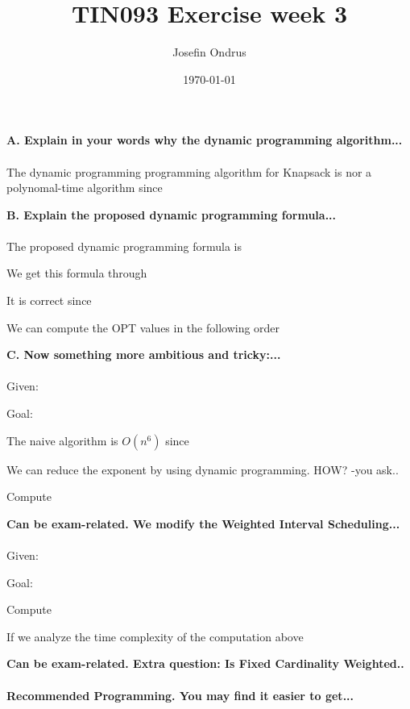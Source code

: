 \documentclass[12pt,oneside,reqno]{amsart}
\begin{document}
\setlength{\parindent}{6pt}
\def\code#1{\texttt{#1}} %

\title{TIN093 Exercise week 3}
\author{Josefin Ondrus}
\date{\today}
\maketitle

\textbf{A. Explain in your words why the dynamic programming algorithm...}\\\\
The dynamic programming programming algorithm for Knapsack is nor a polynomal-time algorithm since 

\textbf{B. Explain the proposed dynamic programming formula...}\\\\
The proposed dynamic programming formula is

We get this formula through

It is correct since

We can compute the OPT values in the following order

\textbf{C. Now something more ambitious and tricky:...}\\\\
Given:

Goal:

The naive algorithm is $O(n^6)$ since

We can reduce the exponent by using dynamic programming. HOW? -you ask..

Compute

\textbf{Can be exam-related. We modify the Weighted Interval Scheduling...}\\\\
Given:

Goal:

Compute 

If we analyze the time complexity of the computation above

\textbf{Can be exam-related. Extra question: Is Fixed Cardinality Weighted..}\\\\
\textbf{Recommended Programming. You may find it easier to get...}\\\\
\end{document}
